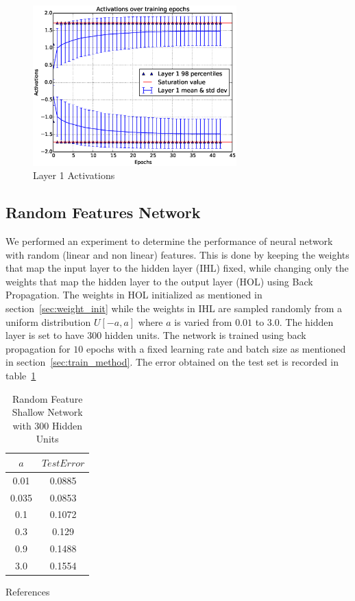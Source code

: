 \documentclass[Proceedings]{ascelike}
\begin{document}
\begin{figure}[H]
  \centering
  \label{fig:actv_dist}
  \includegraphics[width=0.7\textwidth, keepaspectratio]{shallownet_actv.eps}
   \caption{Layer 1 Activations}
\end{figure}


\subsection{Random Features Network}
We performed an experiment to determine the performance of neural network with random (linear and non linear) features. This is done by keeping the weights that map the input layer to the hidden layer (IHL) fixed, while changing only the weights that map the hidden layer to the output layer (HOL) using Back Propagation. The weights in HOL initialized as mentioned in section~\ref{sec:weight_init} while the weights in IHL are sampled randomly from a uniform distribution $U[-a, a]$ where $a$ is varied from $0.01$ to $3.0$. The hidden layer is set to have $300$ hidden units. The network is trained using back propagation for $10$ epochs with a fixed learning rate and batch size as mentioned in section~\ref{sec:train_method}. The error obtained on the test set is recorded in table~\ref{tab:terror}

\begin{table}[H]
\centering
\begin{tabular}{|c||c|}
\hline
$a$&$Test Error$\\
\hline
\hline
0.01&0.0885\\
0.035&0.0853\\
0.1&0.1072\\
0.3&0.129\\
0.9&0.1488\\
3.0&0.1554\\
\hline
\end{tabular}
\caption{Random Feature Shallow Network with 300 Hidden Units}
\label{tab:terror}
\end{table}

{References}

\end{document}
